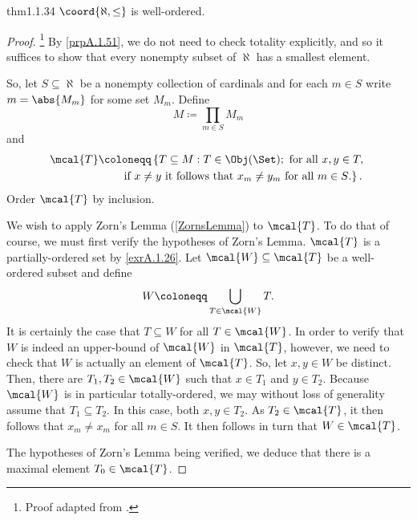 \begin{thm}{}{thm1.1.34}
	$\coord{\aleph ,\leq}$ is well-ordered.
	\begin{proof}\footnote{Proof adapted from \cite{Honig}.}
		By \cref{prpA.1.51}, we do not need to check totality explicitly, and so it suffices to show that every nonempty subset of $\aleph$ has a smallest element.
		
		So, let $S\subseteq \aleph$ be a nonempty collection of cardinals and for each $m\in S$ write $m=\abs{M_m}$ for some set $M_m$.  Define
		\begin{equation}
		M\coloneqq \prod _{m\in S}M_m
		\end{equation}
		and
		\begin{equation}\label{1.1.39}
		\begin{split}
		\mcal{T} & \coloneqq \left\{ T\subseteq M:T\in \Obj (\Set );\text{ for all }x,y\in T,\right. \\ & \qquad \left. \text{if }x\neq y\text{ it follows that }x_m\neq y_m\text{ for all }m\in S\text{.}\right\} .
		\end{split}
		\end{equation}
		Order $\mcal{T}$ by inclusion.
		
		We wish to apply Zorn's Lemma (\cref{ZornsLemma}) to $\mcal{T}$.  To do that of course, we must first verify the hypotheses of Zorn's Lemma.  $\mcal{T}$ is a partially-ordered set by \cref{exrA.1.26}.  Let $\mcal{W}\subseteq \mcal{T}$ be a well-ordered subset and define
		\begin{equation}
		W\coloneqq \bigcup _{T\in \mcal{W}}T.
		\end{equation}
		It is certainly the case that $T\subseteq W$ for all $T\in \mcal{W}$.  In order to verify that $W$ is indeed an upper-bound of $\mcal{W}$ in $\mcal{T}$, however, we need to check that $W$ is actually an element of $\mcal{T}$.  So, let $x,y\in W$ be distinct.  Then, there are $T_1,T_2\in \mcal{W}$ such that $x\in T_1$ and $y\in T_2$.  Because $\mcal{W}$ is in particular totally-ordered, we may without loss of generality assume that $T_1\subseteq T_2$.  In this case, both $x,y\in T_2$.  As $T_2\in \mcal{T}$, it then follows that $x_m\neq x_m$ for all $m\in S$.  It then follows in turn that $W\in \mcal{T}$.
		
		The hypotheses of Zorn's Lemma being verified, we deduce that there is a maximal element $T_0\in \mcal{T}$.
		

\end{proof}
\end{thm}
